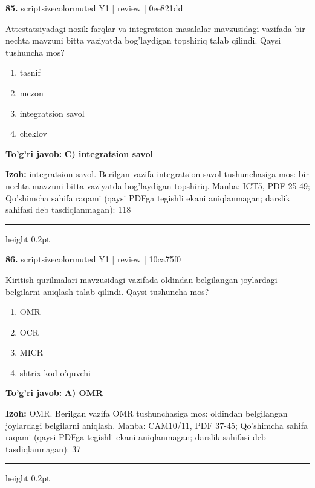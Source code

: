 \documentclass[10pt,a4paper]{article}
\begin{document}
{\bfseries\sffamily\color{ink} 85.} {scriptsizecolor{muted} Y1 | review | 0ee821dd}
\par
Attestatsiyadagi nozik farqlar va integratsion masalalar mavzusidagi vazifada bir nechta mavzuni bitta vaziyatda bog'laydigan topshiriq talab qilindi. Qaysi tushuncha mos?
\begin{enumerate}[label=\Alph*),leftmargin=9mm]
\item tasnif
\item mezon
\item integratsion savol
\item cheklov
\end{enumerate}
\begin{tcolorbox}[enhanced,breakable,colback=teal!4,colframe=teal!60!black,boxrule=0.45pt,arc=1.2mm,left=2.7mm,right=2.7mm,top=1.8mm,bottom=1.8mm,before skip=2mm,after skip=2mm]
{\bfseries\sffamily\color{teal}To'g'ri javob:} \textbf{C) integratsion savol}
\par\smallskip
{\bfseries Izoh:} integratsion savol. Berilgan vazifa integratsion savol tushunchasiga mos: bir nechta mavzuni bitta vaziyatda bog'laydigan topshiriq. Manba: ICT5, PDF 25-49; Qo'shimcha sahifa raqami (qaysi PDFga tegishli ekani aniqlanmagan; darslik sahifasi deb tasdiqlanmagan): 118
\end{tcolorbox}
\vspace{2mm}\hrule height 0.2pt\vspace{3mm}

{\bfseries\sffamily\color{ink} 86.} {scriptsizecolor{muted} Y1 | review | 10ca75f0}
\par
Kiritish qurilmalari mavzusidagi vazifada oldindan belgilangan joylardagi belgilarni aniqlash talab qilindi. Qaysi tushuncha mos?
\begin{enumerate}[label=\Alph*),leftmargin=9mm]
\item OMR
\item OCR
\item MICR
\item shtrix-kod o'quvchi
\end{enumerate}
\begin{tcolorbox}[enhanced,breakable,colback=teal!4,colframe=teal!60!black,boxrule=0.45pt,arc=1.2mm,left=2.7mm,right=2.7mm,top=1.8mm,bottom=1.8mm,before skip=2mm,after skip=2mm]
{\bfseries\sffamily\color{teal}To'g'ri javob:} \textbf{A) OMR}
\par\smallskip
{\bfseries Izoh:} OMR. Berilgan vazifa OMR tushunchasiga mos: oldindan belgilangan joylardagi belgilarni aniqlash. Manba: CAM10/11, PDF 37-45; Qo'shimcha sahifa raqami (qaysi PDFga tegishli ekani aniqlanmagan; darslik sahifasi deb tasdiqlanmagan): 37
\end{tcolorbox}
\vspace{2mm}\hrule height 0.2pt\vspace{3mm}
\end{document}
